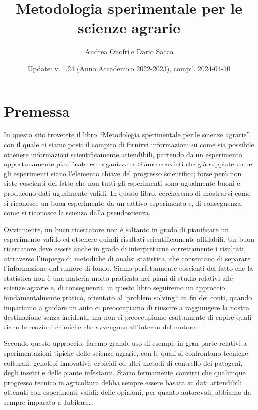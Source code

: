 \documentclass[a4paper,12pt,oneside]{book}
\author{Andrea Onofri e Dario Sacco}
\date{Update: v. 1.24 (Anno Accademico 2022-2023), compil. 2024-04-10}
\title{Metodologia sperimentale per le scienze agrarie}
\subtitle{}
\begin{document}
\maketitle
\tableofcontents

\hypertarget{premessa}{%
\chapter*{Premessa}\label{premessa}}

In questo sito troverete il libro ``Metodologia sperimentale per le scienze agrarie'', con il quale ci siamo posti il compito di fornirvi informazioni su come sia possibile ottenere informazioni scientificamente attendibili, partendo da un esperimento opportunamente pianificato ed organizzato. Siamo convinti che già sappiate come gli esperimenti siano l'elemento chiave del progresso scientifico; forse però non siete coscienti del fatto che non tutti gli esperimenti sono ugualmente buoni e producono dati ugualmente validi. In questo libro, cercheremo di mostrarvi come si riconosce un buon esperimento da un cattivo esperimento e, di conseguenza, come si riconosce la scienza dalla pseudoscienza.

Ovviamente, un buon ricercatore non è soltanto in grado di pianificare un esperimento valido ed ottenere quindi risultati scientificamente affidabili. Un buon ricercatore deve essere anche in grado di interpretarne correttamente i risultati, attraverso l'impiego di metodiche di analisi statistica, che consentano di separare l'informazione dal rumore di fondo. Siamo perfettamente coscienti del fatto che la statistica non è una materia molto praticata nei piani di studio relativi alle scienze agrarie e, di conseguenza, in questo libro seguiremo un approccio fondamentalmente pratico, orientato al `problem solving'; in fin dei conti, quando impariamo a guidare un auto ci preoccupiamo di riuscire a raggiungere la nostra destinazione senza incidenti, ma non ci preoccupiamo esattamente di capire quali siano le reazioni chimiche che avvengono all'interno del motore.

Secondo questo approccio, faremo grande uso di esempi, in gran parte relativi a sperimentazioni tipiche delle scienze agrarie, con le quali si confrontano tecniche colturali, genotipi innovativi, erbicidi ed altri metodi di controllo dei patogeni, degli insetti e delle piante infestanti. Siamo fermamente convinti che qualunque progresso tecnico in agricoltura debba sempre essere basata su dati attendibili ottenuti con esperimenti validi; delle opinioni, per quanto autorevoli, abbiamo da sempre imparato a dubitare\ldots{}
\end{document}
